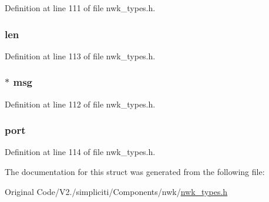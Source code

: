 \-Definition at line 111 of file nwk\-\_\-types.\-h.

\hypertarget{structioctlRawSend__t_a5723e60ffd628510c699eddbce90be23}{
\subsubsection[{len}]{ {\bf len}}}\label{structioctlRawSend__t_a5723e60ffd628510c699eddbce90be23}


\-Definition at line 113 of file nwk\-\_\-types.\-h.

\hypertarget{structioctlRawSend__t_a8dd37bf01473e324d7c15a19fd211de9}{
\subsubsection[{msg}]{$\ast$ {\bf msg}}}\label{structioctlRawSend__t_a8dd37bf01473e324d7c15a19fd211de9}


\-Definition at line 112 of file nwk\-\_\-types.\-h.

\hypertarget{structioctlRawSend__t_a2fa54f9024782843172506fadbee2ac8}{
\subsubsection[{port}]{ {\bf port}}}\label{structioctlRawSend__t_a2fa54f9024782843172506fadbee2ac8}


\-Definition at line 114 of file nwk\-\_\-types.\-h.



\-The documentation for this struct was generated from the following file\-:\begin{DoxyCompactItemize}
\item 
\-Original Code/\-V2./simpliciti/\-Components/nwk/\hyperlink{nwk__types_8h}{nwk\-\_\-types.\-h}\end{DoxyCompactItemize}
